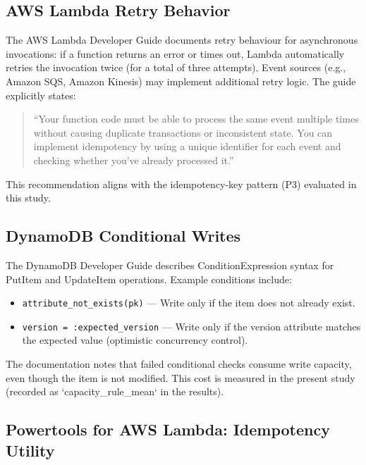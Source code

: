 \subsection{AWS Lambda Retry Behavior}

The AWS Lambda Developer Guide \citep{AWSLambdaDocs} documents retry behaviour for asynchronous invocations: if a function returns an error or times out, Lambda automatically retries the invocation twice (for a total of three attempts). Event sources (e.g., Amazon SQS, Amazon Kinesis) may implement additional retry logic. The guide explicitly states:

\begin{quote}
``Your function code must be able to process the same event multiple times without causing duplicate transactions or inconsistent state. You can implement idempotency by using a unique identifier for each event and checking whether you've already processed it.''
\end{quote}

This recommendation aligns with the idempotency-key pattern (P3) evaluated in this study.

\subsection{DynamoDB Conditional Writes}

The DynamoDB Developer Guide \citep{AWSDynamoDBDocs} describes ConditionExpression syntax for PutItem and UpdateItem operations. Example conditions include:

\begin{itemize}
    \item \texttt{attribute\_not\_exists(pk)} --- Write only if the item does not already exist.
    \item \texttt{version = :expected\_version} --- Write only if the version attribute matches the expected value (optimistic concurrency control).
\end{itemize}

The documentation notes that failed conditional checks consume write capacity, even though the item is not modified. This cost is measured in the present study (recorded as `capacity\_rule\_mean` in the results).

\subsection{Powertools for AWS Lambda: Idempotency Utility}

